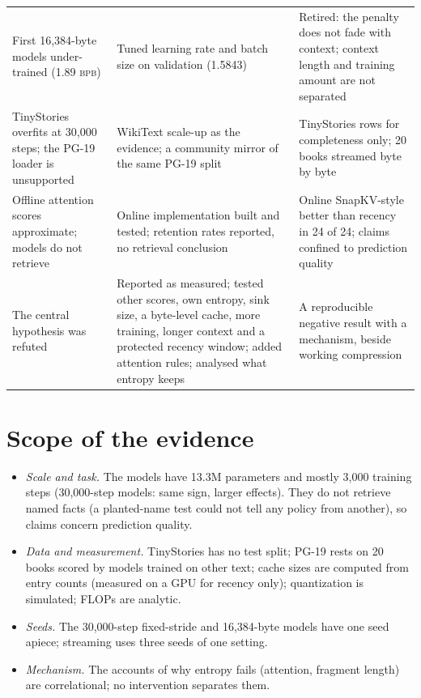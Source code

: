 \documentclass[10pt,twocolumn]{extarticle}
\newcommand{\bpb}{\textsc{bpb}}
\begin{document}
\begin{strip}
\begin{tabular}{@{}>{\raggedright\arraybackslash}p{3.6cm}>{\raggedright\arraybackslash}p{6.6cm}>{\raggedright\arraybackslash}p{6.4cm}@{}}
First 16,384-byte models under-trained (1.89 \bpb) & Tuned learning rate and batch size on validation (1.5843) & Retired: the penalty does not fade with context; context length and training amount are not separated\\
TinyStories overfits at 30,000 steps; the PG-19 loader is unsupported & WikiText scale-up as the evidence; a community mirror of the same PG-19 split & TinyStories rows for completeness only; 20 books streamed byte by byte\\
Offline attention scores approximate; models do not retrieve & Online implementation built and tested; retention rates reported, no retrieval conclusion & Online SnapKV-style better than recency in 24 of 24; claims confined to prediction quality\\
The central hypothesis was refuted & Reported as measured; tested other scores, own entropy, sink size, a byte-level cache, more training, longer context and a protected recency window; added attention rules; analysed what entropy keeps & A reproducible negative result with a mechanism, beside working compression\\
\bottomrule
\end{tabular}
\end{strip}



\section{Scope of the evidence}\label{sec:limits}
\begin{itemize}
\item \textit{Scale and task.} The models have 13.3M parameters and mostly 3,000 training steps (30,000-step models: same sign, larger effects). They do not retrieve named facts (a planted-name test could not tell any policy from another), so claims concern prediction quality.
\item \textit{Data and measurement.} TinyStories has no test split; PG-19 rests on 20 books scored by models trained on other text; cache sizes are computed from entry counts (measured on a GPU for recency only); quantization is simulated; FLOPs are analytic.
\item \textit{Seeds.} The 30,000-step fixed-stride and 16,384-byte models have one seed apiece; streaming uses three seeds of one setting.
\item \textit{Mechanism.} The accounts of why entropy fails (attention, fragment length) are correlational; no intervention separates them.
\end{itemize}
\end{document}
